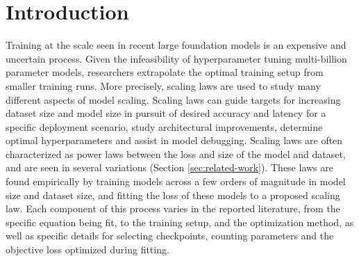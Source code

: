 
\section{Introduction}


Training at the scale seen in recent large foundation models \citep{dubey2024llama,openai2023gpt,reid2024gemini} is an expensive and uncertain process. Given the infeasibility of hyperparameter tuning multi-billion parameter models, researchers extrapolate the optimal training setup from smaller training runs.
More precisely, scaling laws \citep{kaplan2020scaling} are used to study many different aspects of model scaling. Scaling laws can guide targets for increasing dataset size and model size in pursuit of desired accuracy and latency for a specific deployment scenario, study architectural improvements, determine optimal hyperparameters and assist in model debugging. 
 Scaling laws are often characterized as power laws between the loss and size of the model and dataset, and are seen in several variations (Section \ref{sec:related-work}). These laws are found empirically by training models across a few orders of magnitude in model size and dataset size, and fitting the loss of these models to a proposed scaling law. Each component of this process varies in the reported literature, from the specific equation being fit, to the training setup, and the optimization method, as well as specific details for selecting checkpoints, counting parameters and the objective loss optimized during fitting. 

